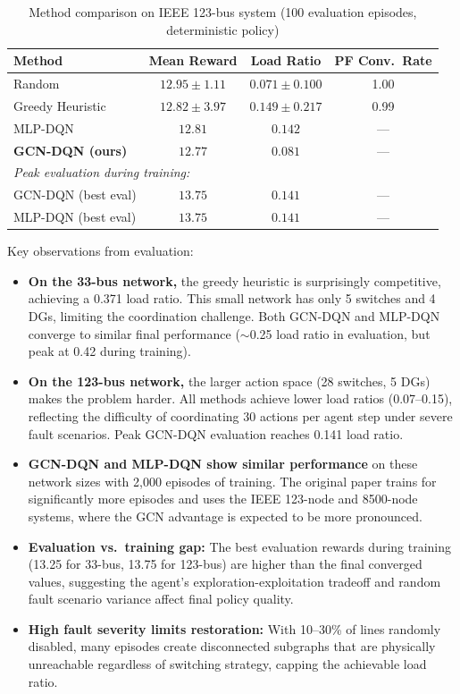 \documentclass[11pt]{article}
\begin{document}
\begin{table}[H]
\centering
\caption{Method comparison on IEEE 123-bus system (100 evaluation episodes, deterministic policy)}
\label{tab:comparison_123}
\small
\begin{tabular}{@{}lccc@{}}
\toprule
\textbf{Method} & \textbf{Mean Reward} & \textbf{Load Ratio} & \textbf{PF Conv.\ Rate} \\
\midrule
Random & $12.95 \pm 1.11$ & $0.071 \pm 0.100$ & 1.00 \\
Greedy Heuristic & $12.82 \pm 3.97$ & $0.149 \pm 0.217$ & 0.99 \\
MLP-DQN & $12.81$ & $0.142$ & --- \\
\rowcolor{lightgray}
\textbf{GCN-DQN (ours)} & $12.77$ & $0.081$ & --- \\
\midrule
\multicolumn{4}{l}{\textit{Peak evaluation during training:}} \\
GCN-DQN (best eval) & $\mathbf{13.75}$ & $\mathbf{0.141}$ & --- \\
MLP-DQN (best eval) & $13.75$ & $0.141$ & --- \\
\bottomrule
\end{tabular}
\end{table}

\noindent Key observations from evaluation:
\begin{itemize}[leftmargin=*]
    \item \textbf{On the 33-bus network,} the greedy heuristic is surprisingly competitive, achieving a 0.371 load ratio. This small network has only 5 switches and 4 DGs, limiting the coordination challenge. Both GCN-DQN and MLP-DQN converge to similar final performance ($\sim$0.25 load ratio in evaluation, but peak at 0.42 during training).
    \item \textbf{On the 123-bus network,} the larger action space (28 switches, 5 DGs) makes the problem harder. All methods achieve lower load ratios (0.07--0.15), reflecting the difficulty of coordinating 30 actions per agent step under severe fault scenarios. Peak GCN-DQN evaluation reaches 0.141 load ratio.
    \item \textbf{GCN-DQN and MLP-DQN show similar performance} on these network sizes with 2,000 episodes of training. The original paper trains for significantly more episodes and uses the IEEE 123-node and 8500-node systems, where the GCN advantage is expected to be more pronounced.
    \item \textbf{Evaluation vs.\ training gap:} The best evaluation rewards during training (13.25 for 33-bus, 13.75 for 123-bus) are higher than the final converged values, suggesting the agent's exploration-exploitation tradeoff and random fault scenario variance affect final policy quality.
    \item \textbf{High fault severity limits restoration:} With 10--30\% of lines randomly disabled, many episodes create disconnected subgraphs that are physically unreachable regardless of switching strategy, capping the achievable load ratio.
\end{itemize}
\end{document}
